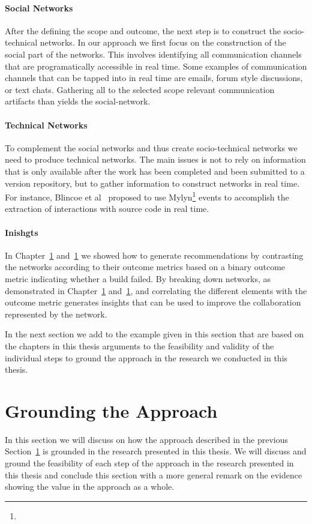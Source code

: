 \paragraph{Social Networks}
After the defining the scope and outcome, the next step is to construct the socio-technical networks.
In our approach we first focus on the construction of the social part of the networks.
This involves identifying all communication channels that are programatically accessible in real time.
Some examples of communication channels that can be tapped into in real time are emails, forum style discussions, or text chats.
Gathering all to the selected scope relevant communication artifacts than yields the social-network.

\paragraph{Technical Networks}
To complement the social networks and thus create socio-technical networks we need to produce technical networks.
The main issues is not to rely on information that is only available after the work has been completed and been submitted to a version repository, but to gather information to construct networks in real time.
For instance, Blincoe et al~\cite{blincoe:cscw:2012} proposed to use Mylyn\footnote{} events to accomplish the extraction of interactions with source code in real time.

\paragraph{Inishgts}
In Chapter~\ref{} and~\ref{} we showed how to generate recommendations by contrasting the networks according to their outcome metrics based on a binary outcome metric indicating whether a build failed.
By breaking down networks, as demonstrated in Chapter~\ref{} and~\ref{}, and correlating the different elements with the outcome metric generates insights that can be used to improve the collaboration represented by the network.

In the next section we add to the example given in this section that are based on the chapters in this thesis arguments to the feasibility and validity of the individual steps to ground the approach in the research we conducted in this thesis.

\section{Grounding the Approach}
In this section we will discuss on how the approach described in the previous Section~\ref{} is grounded in the research presented in this thesis.
We will discuss and ground the feasibility of each step of the approach in the research presented in this thesis and conclude this section with a more general remark on the evidence showing the value in the approach as a whole.

